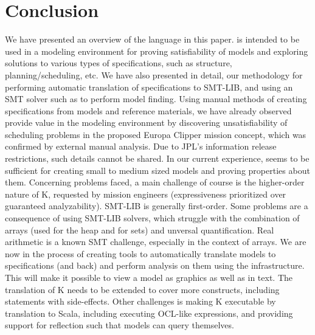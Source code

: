
\section{Conclusion}
\label{sec:conclusion}

We have presented an overview of the \Klang{} language in this
paper. \Klang{} is intended to be used in a modeling environment for
proving satisfiability of \sysml{} models and exploring solutions to
various types of specifications, such as structure,
planning/scheduling, etc. We have also presented in detail, our methodology
for performing automatic translation of \Klang{} specifications to
SMT-LIB, and using an SMT solver such as \zthree{} to perform model
finding. Using manual methods of creating \Klang{} specifications from
\sysml{} models and reference materials, we have already observed
\Klang{} provide value in the modeling environment by discovering
unsatisfiability of scheduling problems in the proposed Europa Clipper
mission concept, which was confirmed by external manual analysis.  Due
to JPL's information release restrictions, such details cannot be
shared.  In our current experience, \Klang{} seems to be sufficient
for creating small to medium sized \sysml{} models and proving
properties about them.
%
Concerning problems faced, a main challenge of course is the
higher-order nature of K, requested by mission engineers
(expressiveness prioritized over guaranteed analyzability). 
SMT-LIB is generally
first-order.  Some problems are a consequence of using SMT-LIB
solvers, which struggle with the combination of arrays (used for the
heap and for sets) and unversal quantification. Real arithmetic is a
known SMT challenge, especially in the context of arrays.
%
We are now in the process of creating tools to automatically translate
\sysml{} models to \Klang{} specifications (and back) and perform analysis on
them using the \Klang{} infrastructure. This will make it possible to view
a model as graphics as well as in text. The translation of K needs to
be extended to cover more constructs, including statements with
side-effects. Other challenges is making K executable by translation
to Scala, including executing OCL-like expressions,
and providing support for reflection such that models can query themselves.

